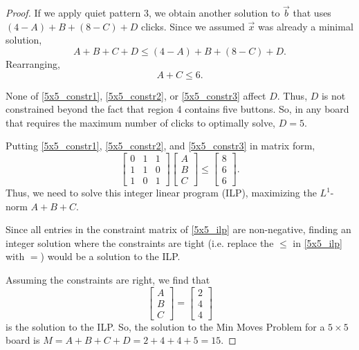 \documentclass[a4paper]{article}
\begin{document}
\begin{proof}
		If we apply quiet pattern 3, we obtain another solution to $\vec{b}$ that uses $(4 - A) + B + (8 - C) + D$ clicks.
		Since we assumed $\vec{x}$ was already a minimal solution,
		\begin{equation*}
			A + B + C + D \leq (4 - A) + B + (8 - C) + D.
		\end{equation*}
		Rearranging,
		\begin{equation}\label{5x5_constr3}
			A + C \leq 6.
		\end{equation}
	
		None of \eqref{5x5_constr1}, \eqref{5x5_constr2}, or \eqref{5x5_constr3} affect $D$.
		Thus, $D$ is not constrained beyond the fact that region 4 contains five buttons.
		So, in any board that requires the maximum number of clicks to optimally solve, $D = 5$.
	
		Putting \eqref{5x5_constr1}, \eqref{5x5_constr2}, and \eqref{5x5_constr3} in matrix form,
		\begin{equation}\label{5x5_ilp}
			\begin{bmatrix}
				0 & 1 & 1 \\
				1 & 1 & 0 \\
				1 & 0 & 1
			\end{bmatrix}
			\begin{bmatrix}
				A \\
				B \\
				C
			\end{bmatrix}
			\leq
			\begin{bmatrix}
				8 \\
				6 \\
				6
			\end{bmatrix}.
		\end{equation}
		Thus, we need to solve this integer linear program (ILP), maximizing the $L^1$-norm $A + B + C$.
		
		Since all entries in the constraint matrix of \eqref{5x5_ilp} are non-negative, finding an integer solution where the constraints are tight (i.e. replace the $\leq$ in \eqref{5x5_ilp} with $=$) would be a solution to the ILP.
		
		Assuming the constraints are right, we find that
		\begin{equation*}
			\begin{bmatrix}
				A \\
				B \\
				C
			\end{bmatrix}
			=
			\begin{bmatrix}
				2 \\
				4 \\
				4
			\end{bmatrix}
		\end{equation*}
		is the solution to the ILP.
		So, the solution to the Min Moves Problem for a $5 \times 5$ board is $M = A + B + C + D = 2 + 4 + 4 + 5 = 15$.
	\end{proof}
\end{document}
